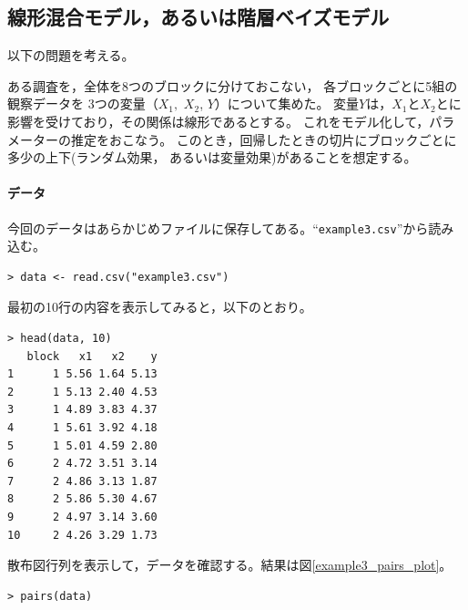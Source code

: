 \documentclass[11pt,uplatex]{jsarticle}
\begin{document}

\subsection{線形混合モデル，あるいは階層ベイズモデル}
\label{mixed_model}

以下の問題を考える。
\vspace{1zw}

\hspace{18mm}
\begin{minipage}{100mm}
\begin{breakbox}
\noindent
ある調査を，全体を8つのブロックに分けておこない，
各ブロックごとに5組の観察データを
3つの変量（$X_1,$ $X_2$, $Y$）について集めた。
変量$Y$は，$X_1$と$X_2$とに影響を受けており，その関係は線形であるとする。
これをモデル化して，パラメーターの推定をおこなう。
このとき，回帰したときの切片にブロックごとに多少の上下(ランダム効果，
あるいは変量効果)があることを想定する。
\end{breakbox}
\end{minipage}

\vspace{2zw}

\paragraph{データ}
今回のデータはあらかじめファイルに保存してある。``\texttt{example3.csv}''から読み込む。
\begin{lstlisting}
> data <- read.csv("example3.csv")
\end{lstlisting}

最初の10行の内容を表示してみると，以下のとおり。
\begin{lstlisting}
> head(data, 10)
   block   x1   x2    y
1      1 5.56 1.64 5.13
2      1 5.13 2.40 4.53
3      1 4.89 3.83 4.37
4      1 5.61 3.92 4.18
5      1 5.01 4.59 2.80
6      2 4.72 3.51 3.14
7      2 4.86 3.13 1.87
8      2 5.86 5.30 4.67
9      2 4.97 3.14 3.60
10     2 4.26 3.29 1.73
\end{lstlisting}

散布図行列を表示して，データを確認する。結果は図\ref{example3_pairs_plot}。

\begin{lstlisting}
> pairs(data)
\end{lstlisting}
\end{document}
